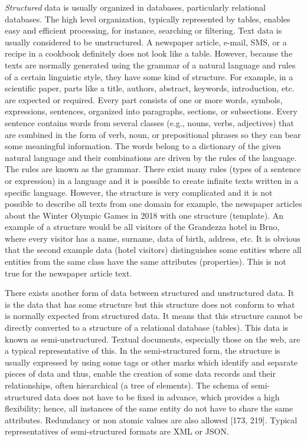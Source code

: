\documentclass[11pt,openany,executivepaper]{book}
\begin{document}
\begin{sloppypar}
\textit{Structured} data is usually organized in databases, particularly relational databases. The high level organization, typically represented by tables, enables easy and efficient processing, for instance, searching or filtering. Text data is usually considered to be unstructured. A newspaper article, e-mail, SMS, or a recipe in a cookbook definitely does not look like a table. However, because the texts are normally generated using the grammar of a natural language and rules of a certain linguistic style, they have some kind of structure. For example, in a scientific paper, parts like a title, authors, abstract, keywords, introduction, etc. are expected or required. Every part consists of one or more words, symbols, expressions, sentences, organized into paragraphs, sections, or subsections. Every sentence contains words from several classes (e.g., nouns, verbs, adjectives) that are combined in the form of verb, noun, or prepositional phrases so they can bear some meaningful information. The words belong to a dictionary of the given natural language and their combinations are driven by the rules of the language. The rules are known as the grammar. There exist many rules (types of a sentence or expression) in a language and it is possible to create infinite texts written in a specific language. However, the structure is very complicated and it is not possible to describe all texts from one domain for example, the newspaper articles about the Winter Olympic Games in 2018 with one structure (template). An example of a structure would be all visitors of the Grandezza hotel in Brno, where every visitor has a name, surname, data of birth, address, etc. It is obvious that the second example data (hotel visitors) distinguishes some entities where all entities from the same class have the same attributes (properties). This is not true for the newspaper article text.
\end{sloppypar}

There exists another form of data between structured and unstructured data. It is the data that has some structure but this structure does not conform to what is normally expected from structured data. It means that this structure cannot be directly converted to a structure of a relational database (tables). This data is known as semi-unstructured. Textual documents, especially those on the web, are a typical representative of this. In the semi-structured form, the structure is usually expressed by using some tags or other marks which identify and separate pieces of data and thus, enable the creation of some data records and their relationships, often hierarchical (a tree of elements). The schema of semi-structured data does not have to be fixed in advance, which provides a high flexibility; hence, all instances of the same entity do not have to share the same attributes. Redundancy or non atomic values are also allowed [173, 219]. Typical representatives of semi-structured formats are XML or JSON.
\end{document}
